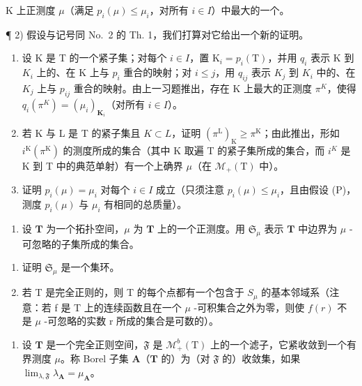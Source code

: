 K 上正测度 \(\mu\)（满足 \(p_i(\mu) \leqslant \mu_i\)，对所有 \(i \in I\)）中最大的一个。

¶ 2) 假设与记号同 No.~2 的 Th. 1，我们打算对它给出一个新的证明。

\begin{enumerate}
\def\labelenumi{\alph{enumi})}
\item
  设 K 是 T 的一个紧子集；对每个 \(i \in I\)，置 \(\mathrm{K}_{i} = p_{i}(\mathrm{T})\)，并用 \(q_{i}\) 表示 K 到 \(K_{i}\) 上的、在 K 上与 \(p_{i}\) 重合的映射；对 \(i \leqslant j\)，用 \(q_{ij}\) 表示 \(K_{j}\) 到 \(K_{i}\) 中的、在 \(K_{j}\) 上与 \(p_{ij}\) 重合的映射。由上一习题推出，存在 K 上最大的正测度 \(\pi^{K}\)，使得 \(q_{i}(\pi^{K}) = (\mu_{i})_{\mathbf{K}_{i}}\)（对所有 \(i \in I\)）。
\item
  若 K 与 L 是 T 的紧子集且 \(K \subset L\)，证明 \((\pi^{\mathrm{L}})_{\mathrm{K}} \geqslant \pi^{\mathrm{K}}\)；由此推出，形如 \(i^{\mathrm{K}}(\pi^{\mathrm{K}})\) 的测度所成的集合（其中 K 取遍 T 的紧子集所成的集合，而 \(i^{K}\) 是 K 到 T 中的典范单射）有一个上确界 \(\mu\)（在 \(\mathcal{M}_{+}(\mathrm{T})\) 中）。
\item
  证明 \(p_i(\mu) = \mu_i\) 对每个 \(i \in I\) 成立（只须注意 \(p_i(\mu) \leqslant \mu_i\)，且由假设 (P)，测度 \(p_i(\mu)\) 与 \(\mu_i\) 有相同的总质量）。
\end{enumerate}

\exercisesection{}

\begin{enumerate}
\def\labelenumi{\arabic{enumi})}
\tightlist
\item
  设 \(\mathbf{T}\) 为一个拓扑空间，\(\mu\) 为 \(\mathbf{T}\) 上的一个正测度。用 \(\mathfrak{S}_{\mu}\) 表示 \(\mathbf{T}\) 中边界为 \(\mu\) -可忽略的子集所成的集合。
\end{enumerate}

\begin{enumerate}
\def\labelenumi{\alph{enumi})}
\item
  证明 \(\mathfrak{S}_{\mu}\) 是一个集环。
\item
  若 T 是完全正则的，则 T 的每个点都有一个包含于 \(S_{\mu}\) 的基本邻域系（注意：若 f 是 T 上的连续函数且在一个 \(\mu\) -可积集合之外为零，则使 \(f(r)\) 不是 \(\mu\) -可忽略的实数 r 所成的集合是可数的）。
\end{enumerate}

\begin{enumerate}
\def\labelenumi{\arabic{enumi})}
\setcounter{enumi}{1}
\tightlist
\item
  设 \(\mathbf{T}\) 是一个完全正则空间，\(\mathfrak{F}\) 是 \(\mathcal{M}_{+}^{b}(\mathrm{T})\) 上的一个滤子，它紧收敛到一个有界测度 \(\mu\)。称 Borel 子集 \(\mathbf{A}\)（\(\mathbf{T}\) 的）为（对 \(\mathfrak{F}\) 的）收敛集，如果 \(\lim_{\lambda,\mathfrak{F}} \lambda_{\mathbf{A}} = \mu_{\mathbf{A}}\)。
\end{enumerate}


